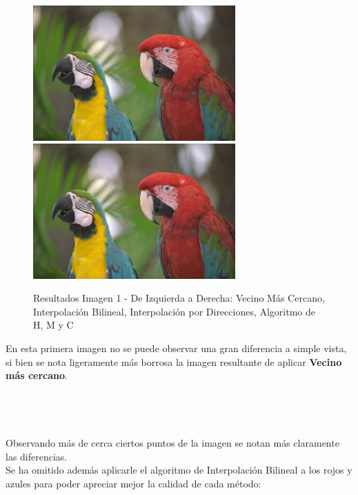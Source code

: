 \documentclass[a4paper]{article}
\begin{document}
\begin{figure}[htbp]
\centering

\includegraphics[width=220pt]{img/img1-2.png}       %
\includegraphics[width=220pt]{img/img1-3.png}       %

\caption{Resultados Imagen 1 - De Izquierda a Derecha: Vecino Más Cercano, Interpolación Bilineal, Interpolación por Direcciones,  Algoritmo de H, M y C}
\end{figure}

En esta primera imagen no se puede observar una gran diferencia a simple vista, si bien se nota ligeramente más borrosa la imagen resultante de aplicar \textbf{Vecino más cercano}.\\ \\ \\ \\ \\
Observando más de cerca ciertos puntos de la imagen se notan más claramente las diferencias.\\ 
Se ha omitido además aplicarle el algoritmo de Interpolación Bilineal a los rojos y azules para poder apreciar mejor la calidad de cada método:\\
\end{document}
